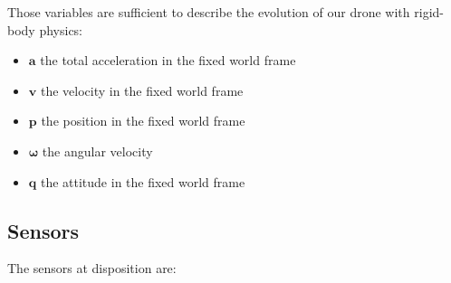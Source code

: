 \documentclass[]{article}
\providecommand{\tightlist}{%
  \setlength{\itemsep}{0pt}\setlength{\parskip}{0pt}}
\begin{document}
Those variables are sufficient to describe the evolution of our drone
with rigid-body physics:

\begin{itemize}
\tightlist
\item
  \(\mathbf{a}\) the total acceleration in the fixed world frame
\item
  \(\mathbf{v}\) the velocity in the fixed world frame
\item
  \(\mathbf{p}\) the position in the fixed world frame
\item
  \(\boldsymbol{\omega}\) the angular velocity
\item
  \(\mathbf{q}\) the attitude in the fixed world frame
\end{itemize}

\subsection{Sensors}\label{sensors}

The sensors at disposition are:
\end{document}
